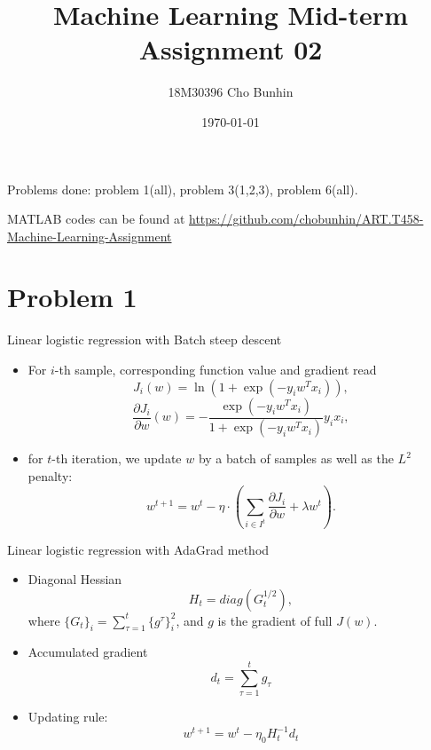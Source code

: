 \documentclass{article}
\begin{document}
\newcommand{\setr}{\mathbb{R}}
\newenvironment{myproof}[1][Proof.]{\begin{trivlist}
\item[\hskip \labelsep {\bfseries #1}]}{\end{trivlist}}


\title{Machine Learning Mid-term Assignment 02}
\author{18M30396 Cho Bunhin}
\date{\today} 
\maketitle
Problems done: problem 1(all), problem 3(1,2,3), problem 6(all).

MATLAB codes can be found at\newline
\small
\url{https://github.com/chobunhin/ART.T458-Machine-Learning-Assignment}
\section*{Problem 1}
\normalsize
Linear logistic regression with Batch steep descent
\begin{itemize}
	\item For $i$-th sample, corresponding function value and gradient read
		\begin{equation}
		J_i(w)=\ln(1+\exp(-y_iw^Tx_i)) ,
		\end{equation}
		\begin{equation}
		\frac{\partial J_i}{\partial w}(w)=-\frac{\exp(-y_iw^Tx_i)}{1+\exp(-y_iw^Tx_i)}y_ix_i,
		\end{equation}
	\item for $t$-th iteration, we update $w$ by a batch of samples as well as the $L^2$ penalty:
		\begin{equation}
		w^{t+1} = w^t - \eta \cdot \left(\sum_{i\in I^t}\frac{\partial J_i}{\partial w} + \lambda w^t\right).
		\end{equation}
\end{itemize}
Linear logistic regression with AdaGrad method
\begin{itemize}
	\item Diagonal Hessian 
		\begin{equation}
		  H_t = diag(G_t^{1/2}),
		\end{equation}
		where $\{G_t\}_i = \sum_{\tau=1}^{t}\{g^\tau\}_i^2$, and $g$ is the gradient of full $J(w)$.
  \item Accumulated gradient
    \begin{equation}
      d_t  = \sum_{\tau=1}^t g_{\tau}
    \end{equation}
  \item Updating rule:
  	\begin{equation}
  	  w^{t+1} = w^t - \eta_0 H_t^{-1}d_t
  	\end{equation}
\end{itemize}
\end{document}
